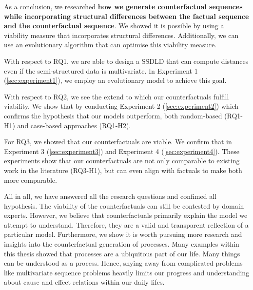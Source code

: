 \documentclass[./../../paper.tex]{subfiles}
\begin{document}
As a conclusion, we researched \textbf{how we generate counterfactual sequences while incorporating structural differences between the factual sequence and the counterfactual sequence}. We showed it is possible by using a viability measure that incorporates structural differences. Additionally, we can use an evolutionary algorithm that can optimise this viability measure. 

With respect to RQ1\footnotemark[1], we are able to design a \Gls{SSDLD} that can compute distances even if the semi-structured data is multivariate. In Experiment 1 (\autoref{sec:experiment1}), we employ an evolutionary model to achieve this goal.

With respect to RQ2\footnotemark[2], we see the extend to which our counterfactuals fulfill viability. 
We show that by conducting Experiment 2 (\autoref{sec:experiment2}) which confirms the hypothesis that our models outperform, both random-based (RQ1-H1) and case-based approaches (RQ1-H2).  

For RQ3\footnotemark[3], we showed that our counterfactuals are viable. 
We confirm that in Experiment 3 (\autoref{sec:experiment3}) and Experiment 4 (\autoref{sec:experiment4}).
These experiments show that our counterfactuals are not only comparable to existing work in the literature (RQ3-H1), but can even align with factuals to make both more comparable.

All in all, we have answered all the research questions and confimed all hypothesis. The viability of the counterfactuals can still be contested by domain experts. However, we believe that counterfactuals primarily explain the model we attempt to understand. Therefore, they are a valid and transparent reflection of a particular model. Furthermore, we show it is worth pursuing more research and insights into the counterfactual generation of processes. Many examples within this thesis showed that processes are a ubiquitous part of our life. Many things can be understood as a process. Hence, shying away from complicated problems like multivariate sequence problems heavily limits our progress and understanding about cause and effect relations within our daily lifes. 

\end{document}
